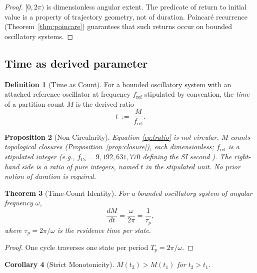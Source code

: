 \documentclass[twocolumn,10pt,a4paper]{article}
\theoremstyle{thmstyle}
\newtheorem{theorem}{Theorem}[section]
\newtheorem{proposition}[theorem]{Proposition}
\newtheorem{corollary}[theorem]{Corollary}
\theoremstyle{definition}
\newtheorem{definition}[theorem]{Definition}
\theoremstyle{remark}
\begin{document}
\begin{proof}
$[0,2\pi)$ is dimensionless angular extent. The predicate of return
to initial value is a property of trajectory geometry, not of duration.
Poincar\'{e} recurrence (Theorem~\ref{thm:poincare}) guarantees that
such returns occur on bounded oscillatory systems.
\end{proof}

\subsection{Time as derived parameter}

\begin{definition}[Time as Count]
\label{def:tcount}
For a bounded oscillatory system with an attached reference oscillator
at frequency $f_{\mathrm{ref}}$ stipulated by convention, the
\emph{time} of a partition count $M$ is the derived ratio
\begin{equation}
t\;:=\;\frac{M}{f_{\mathrm{ref}}}.
\label{eq:tratio}
\end{equation}
\end{definition}

\begin{proposition}[Non-Circularity]
\label{prop:nocirc}
Equation \eqref{eq:tratio} is not circular. $M$ counts topological
closures (Proposition~\ref{prop:closure}), each dimensionless;
$f_{\mathrm{ref}}$ is a stipulated integer (e.g., $f_{\mathrm{Cs}}=
9{,}192{,}631{,}770$ defining the SI second \citep{si2019}). The
right-hand side is a ratio of pure integers, named $t$ in the
stipulated unit. No prior notion of duration is required.
\end{proposition}

\begin{theorem}[Time-Count Identity]
\label{thm:tc}
For a bounded oscillatory system of angular frequency $\omega$,
\begin{equation}
\boxed{\;\frac{dM}{dt}=\frac{\omega}{2\pi}=\frac{1}{\tau_{p}},\;}
\label{eq:tc}
\end{equation}
where $\tau_{p}=2\pi/\omega$ is the residence time per state.
\end{theorem}

\begin{proof}
One cycle traverses one state per period $T_{p}=2\pi/\omega$.
\end{proof}

\begin{corollary}[Strict Monotonicity]
\label{cor:mono}
$M(t_{2})>M(t_{1})$ for $t_{2}>t_{1}$.
\end{corollary}
\end{document}
